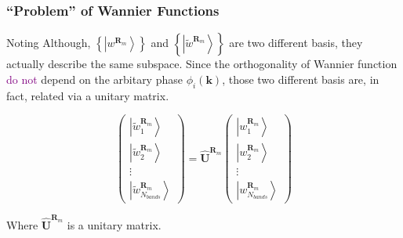 \documentclass{beamer}
\begin{document}
  \begin{frame}
    \frametitle{``Problem'' of Wannier Functions}
  
    \begin{block}{Noting}
      Although, \(\left\{\left|w^{\mathbf{R}_m}\right\rangle\right\}\) and \(\left\{\left|\tilde{w}^{\mathbf{R}_m}\right\rangle\right\}\) are two different basis, they actually describe the same subspace. Since the orthogonality of Wannier function \textcolor{purple}{do not} depend on the arbitary phase \(\phi_i(\mathbf{k})\), those two different basis are, in fact, related via a unitary matrix.
    \end{block}

    \begin{equation}
      \left( \begin{array}{c}
        \left|\tilde{w}^{\mathbf{R}_m}_1\right\rangle \\[5pt]
        \left|\tilde{w}^{\mathbf{R}_m}_2\right\rangle \\
        \vdots\\
        \left|\tilde{w}^{\mathbf{R}_m}_{N_{bands}}\right\rangle
        \end{array} \right) = \mathbf{\widehat{U}}^{\mathbf{R}_m}
      \left( \begin{array}{ccc}
        \left|w^{\mathbf{R}_m}_1\right\rangle \\[5pt]
        \left|w^{\mathbf{R}_m}_2\right\rangle \\
        \vdots\\
        \left|w^{\mathbf{R}_m}_{N_{bands}}\right\rangle
        \end{array} \right)
    \end{equation}
   
    Where \(\mathbf{\widehat{U}}^{\mathbf{R}_m}\) is a unitary matrix.
  
  \end{frame}
\end{document}
